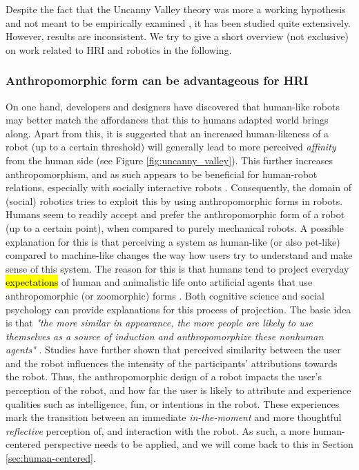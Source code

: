 \documentclass{frontiersSCNS} %
\begin{document}
Despite the fact that the Uncanny Valley theory was more a working hypothesis and not 
meant to be empirically examined \citep{cheetham_human_2011}, it has been studied quite 
extensively. However, results are inconsistent. We try to give a short overview (not 
exclusive) on work related to HRI and robotics in the following. 
 
 
\subsubsection{Anthropomorphic form can be advantageous for HRI\\}

On one hand, developers and designers have discovered that human-like robots may better 
match the affordances that this to humans adapted world brings along. 
Apart from this, it is suggested that an increased human-likeness of a robot (up to a 
certain threshold) will generally lead to 
more perceived \textit{affinity} from the human side \citep{mori_uncanny_1970} (see 
Figure \ref{fig:uncanny_valley}).
This further increases anthropomorphism, and as such
appears to be beneficial for human-robot relations, especially with socially 
interactive robots \citep{fong_survey_2003}. Consequently, the domain of (social) 
robotics tries to exploit this by using
anthropomorphic forms in robots.
Humans seem to readily accept and prefer the 
anthropomorphic form of a robot (up to a certain point), when compared to purely mechanical 
robots. A possible explanation for this is that perceiving a system as
human-like (or also pet-like) compared to machine-like changes the 
way how users try to understand and make sense of this system. The reason for this is 
that humans tend to project everyday 
\hl{expectations} of human and animalistic life onto artificial agents that use 
anthropomorphic (or zoomorphic) forms \citep{schmitz_concepts_2011}. 
Both cognitive science 
and social psychology can provide explanations for this process of projection. The basic idea 
is that \textit{"the more similar in 
appearance, the more people are likely to use themselves as a source of induction 
and anthropomorphize these nonhuman agents"} \citep{epley_seeing_2007}. Studies have further 
shown that perceived similarity between the user and the robot influences the intensity of 
the participants' attributions towards the robot. Thus, the anthropomorphic design of a robot 
impacts the user's perception of the robot, and how far the user is likely to attribute and 
experience qualities such as intelligence, fun, or intentions in the robot. 
These experiences mark the transition between an immediate \textit{in-the-moment} and more thoughtful \textit{reflective} \citep{takayama_perspectives_2012} perception of, and interaction with the robot. As such, a more human-centered perspective needs to be applied, and we will come back to this in Section \ref{sec:human-centered}.
\end{document}
